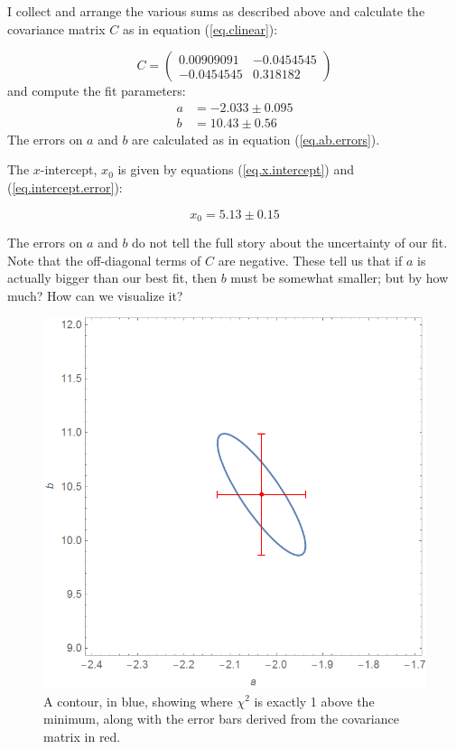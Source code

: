 \documentclass[letterpaper,12pt]{article}
\newcommand{\myMatrix}[1]{\bm{\mathit{#1}}}
\begin{document}
I collect and arrange the various sums as described above and calculate the covariance matrix $\myMatrix{C}$ as in equation (\ref{eq.clinear}):

\begin{equation}
\myMatrix{C}=
\begin{pmatrix}
0.00909091 & -0.0454545 \\
-0.0454545 & 0.318182
\end{pmatrix}
\end{equation}
and compute the fit parameters:
\begin{equation} \label{eq.best.ab.fit}
\begin{aligned}
a &= -2.033\pm 0.095 \\
b &= 10.43\pm 0.56
\end{aligned}
\end{equation}
The errors on $a$ and $b$ are calculated as in equation (\ref{eq.ab.errors}).

The $x$-intercept, $x_0$ is given by equations (\ref{eq.x.intercept}) and (\ref{eq.intercept.error}):

\begin{equation}
x_0=5.13\pm 0.15
\end{equation}

The errors on $a$ and $b$ do not tell the full story about the uncertainty of our fit. Note that the off-diagonal terms of $\myMatrix{C}$ are negative. These tell us that if $a$ is actually bigger than our best fit, then $b$ must be somewhat smaller; but by how much? How can we visualize it?

\begin{figure}[ht] 
	\centering	\includegraphics[width=0.7\columnwidth]{fig.ab.covariance}
	\caption{
		\label{fig.ab.covariance}
		A contour, in blue, showing where $\chi^2$ is exactly 1 above the minimum, along with the error bars derived from the covariance matrix in red.
	}
\end{figure}
\end{document}
